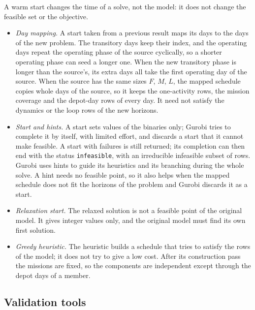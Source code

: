 \documentclass[11pt,a4paper]{article}
\theoremstyle{plain}
\theoremstyle{definition}
\theoremstyle{remark}
\begin{document}
A warm start changes the time of a solve, not the model: it does not change the feasible set or the objective.
\begin{itemize}[nosep]
  \item \emph{Day mapping.} A start taken from a previous result maps its days to the days of the new problem.
    The transitory days keep their index, and the operating days repeat the operating phase of the source cyclically, so a shorter operating phase can seed a longer one.
    When the new transitory phase is longer than the source's, its extra days all take the first operating day of the source.
    When the source has the same sizes $F$, $M$, $L$, the mapped schedule copies whole days of the source, so it keeps the one-activity rows, the mission coverage and the depot-day rows of every day.
    It need not satisfy the dynamics or the loop rows of the new horizons.
  \item \emph{Start and hints.} A start sets values of the binaries only; Gurobi tries to complete it by itself, with limited effort, and discards a start that it cannot make feasible.
    A start with failures is still returned; its completion can then end with the status \texttt{infeasible}, with an irreducible infeasible subset of rows.
    Gurobi uses hints to guide its heuristics and its branching during the whole solve.
    A hint needs no feasible point, so it also helps when the mapped schedule does not fit the horizons of the problem and Gurobi discards it as a start.
  \item \emph{Relaxation start.} The relaxed solution is not a feasible point of the original model.
    It gives integer values only, and the original model must find its own first solution.
  \item \emph{Greedy heuristic.} The heuristic builds a schedule that tries to satisfy the rows of the model; it does not try to give a low cost.
    After its construction pass the missions are fixed, so the components are independent except through the depot days of a member.
\end{itemize}

\subsection{Validation tools}
\label{sec:impl_validation}
\end{document}
